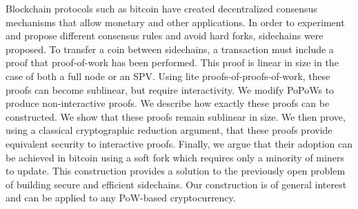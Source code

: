 Blockchain protocols such as bitcoin have created decentralized consensus
mechanisms that allow monetary and other applications. In order to experiment
and propose different consensus rules and avoid hard forks, sidechains were
proposed. To transfer a coin between sidechains, a transaction must include a
proof that proof-of-work has been performed. This proof is linear in size in
the case of both a full node or an SPV. Using lite proofs-of-proofs-of-work,
these proofs can become sublinear, but require interactivity. We modify PoPoWs
to produce non-interactive proofs. We describe how exactly these proofs can be
constructed. We show that these proofs remain sublinear in size. We then prove,
using a classical cryptographic reduction argument, that these proofs provide
equivalent security to interactive proofs. Finally, we argue that their
adoption can be achieved in bitcoin using a soft fork which requires only a
minority of miners to update. This construction provides a solution to the
previously open problem of building secure and efficient sidechains. Our
construction is of general interest and can be applied to any PoW-based
cryptocurrency.
